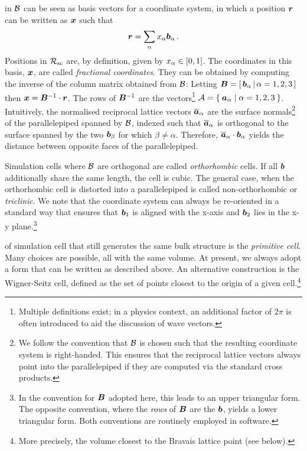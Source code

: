  in $\mathcal{B}$ can be seen as basis vectors for a coordinate system, in which a position $\boldsymbol{r}$ can be written as $\boldsymbol{x}$ such that
\begin{equation}
	\boldsymbol{r} = \sum_\alpha x_\alpha \boldsymbol{b}_\alpha \, .
\end{equation}
Positions in $\mathcal{R_{\text{sc}}}$ are, by definition, given by $x_\alpha \in [0, 1]$. The coordinates in this basis, $\boldsymbol{x}$, are called \emph{fractional coordinates}. They can be obtained by computing the inverse of the column matrix obtained from $\mathcal{B}$: Letting $\boldsymbol{B} = \left[\, \boldsymbol{b}_\alpha\, |\, \alpha=1,2,3 \, \right]$ then $\boldsymbol{x} = \boldsymbol{B}^{-1} \cdot \boldsymbol{r}$.
The rows of $\boldsymbol{B}^{-1}$ are the  vectors\footnote{Multiple definitions exist; in a physics context, an additional factor of $2\pi$ is often introduced to aid the discussion of wave vectors.} $\mathcal{A} = \Set{\boldsymbol{a}_\alpha | \alpha=1,2,3}$. Intuitively, the normalised reciprocal lattice vectors $\overline{\bm{a}}_\alpha$ are the surface normals\footnote{We follow the convention that $\mathcal{B}$ is chosen such that the resulting coordinate system is right-handed. This ensures that the reciprocal lattice vectors always point into the parallelepiped if they are computed via the standard cross products.} of the parallelepiped spanned by $\mathcal{B}$, indexed such that $\overline{\bm{a}}_\alpha$ is orthogonal to the surface spanned by the two $\boldsymbol{b}_\beta$ for which $\beta \neq \alpha$. Therefore, $\overline{\bm{a}}_\alpha \cdot \boldsymbol{b}_\alpha$ yields the distance between opposite faces of the parallelepiped.

Simulation cells where $\mathcal{B}$ are orthogonal are called \emph{orthorhombic} cells. If all $\boldsymbol{b}$ additionally share the same length, the cell is cubic. The general case, when the orthorhombic cell is distorted into a parallelepiped is called non-orthorhombic or \emph{triclinic}. We note that the coordinate system can always be re-oriented in a standard way that ensures that $\boldsymbol{b}_1$ is aligned with the x-axis and $\boldsymbol{b}_2$ lies in the x-y plane.\footnote[][-0.5\baselineskip]{In the convention for $\boldsymbol{B}$ adopted here, this leads to an upper triangular form. The opposite convention, where the \emph{rows} of $\boldsymbol{B}$ are the $\boldsymbol{b}$, yields a lower triangular form. Both conventions are routinely employed in software.}

 of simulation cell that still generates the same bulk structure is the \emph{primitive cell}. Many choices are possible, all with the same volume. At present, we always adopt a form that can be written as described above. An alternative construction is the Wigner-Seitz cell, defined as the set of points closest to the origin of a given cell.\footnote{More precisely, the volume closest to the Bravais lattice point (see below).}

